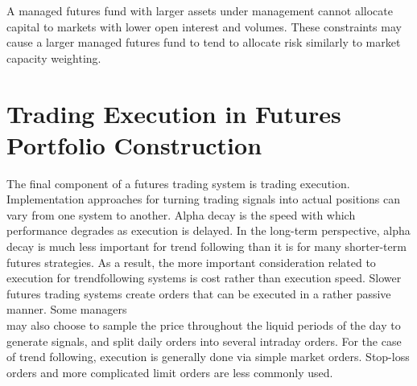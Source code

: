 \documentclass[11pt]{article}
\begin{document}
A managed futures fund with larger assets under management cannot allocate capital to markets with lower open interest and volumes. These constraints may cause a larger managed futures fund to tend to allocate risk similarly to market capacity weighting.

\section*{Trading Execution in Futures Portfolio Construction}
The final component of a futures trading system is trading execution. Implementation approaches for turning trading signals into actual positions can vary from one system to another. Alpha decay is the speed with which performance degrades as execution is delayed. In the long-term perspective, alpha decay is much less important for trend following than it is for many shorter-term futures strategies. As a result, the more important consideration related to execution for trendfollowing systems is cost rather than execution speed. Slower futures trading systems create orders that can be executed in a rather passive manner. Some managers\\
may also choose to sample the price throughout the liquid periods of the day to generate signals, and split daily orders into several intraday orders. For the case of trend following, execution is generally done via simple market orders. Stop-loss orders and more complicated limit orders are less commonly used.
\end{document}
